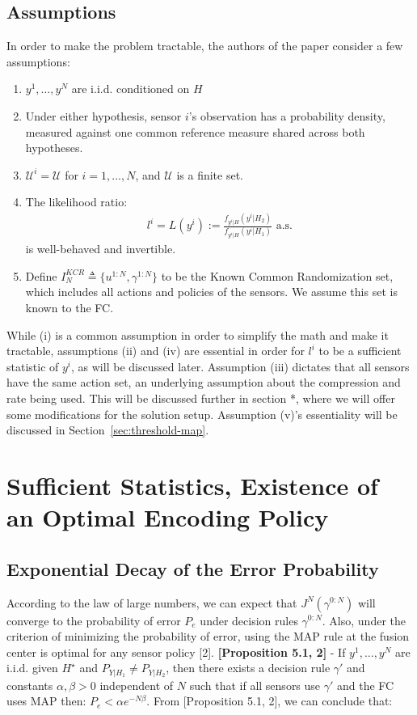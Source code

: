 \documentclass[11pt]{article}
\newcommand{\HS}{H^\star}
\begin{document}
\subsection{Assumptions}
In order to make the problem tractable, the authors of the paper consider a few assumptions:
\begin{enumerate}[label=(\roman*)]
    \item $y^1, \dots, y^N$ are i.i.d. conditioned on $H$
    \item Under either hypothesis, sensor $i$'s observation has a probability density, measured against one common reference measure shared across both hypotheses.
    \item $\mathcal{U}^i = \mathcal{U}$ for $i = 1,\dots ,N$, and $\mathcal{U}$ is a finite set.
    \item The likelihood ratio:
    \begin{align}
        l^i = L(y^i) := \frac{f_{y^i|H}(y^i|H_2)}{f_{y^i|H}(y^i|H_1)} \text{ a.s.}
    \end{align}
    is well-behaved and invertible.
    \item Define $I_N^{KCR} \triangleq \{u^{1:N},\gamma^{1:N}\}$ to be the Known Common Randomization set, which includes all actions and policies of the sensors. We assume this set is known to the FC.
\end{enumerate}
While (i) is a common assumption in order to simplify the math and make it tractable, assumptions (ii) and (iv) are essential in order for $l^i$ to be a sufficient statistic of $y^i$, as will be discussed later.
Assumption (iii) dictates that all sensors have the same action set, an underlying assumption about the compression and rate being used. This will be discussed further in section *, where we will offer some modifications for the solution setup.
Assumption (v)'s essentiality will be discussed in Section~\ref{sec:threshold-map}.

\section{Sufficient Statistics, Existence of an Optimal Encoding Policy}

\subsection{Exponential Decay of the Error Probability}
\label{sec:exp-decay}
According to the law of large numbers, we can expect that $J^N(\gamma^{0:N})$ will
converge to the probability of error $P_e$ under decision rules $\gamma^{0:N}$. Also, under the criterion of minimizing the probability of error,
using the MAP rule at the fusion center is optimal for any sensor policy [2].\newline \newline
\textbf{[Proposition 5.1, 2]} - If $y^1,\dots,y^N$ are i.i.d. given $\HS$ and $P_{Y|H_1} \neq P_{Y|H_2}$, then there exists a decision rule $\gamma'$ and constants $\alpha, \beta > 0$ independent of $N$ such that
if all sensors use $\gamma'$ and the FC uses MAP then: $P_e < \alpha e^{-N\beta}$.\newline \newline
From [Proposition 5.1, 2], we can conclude that:
\end{document}
